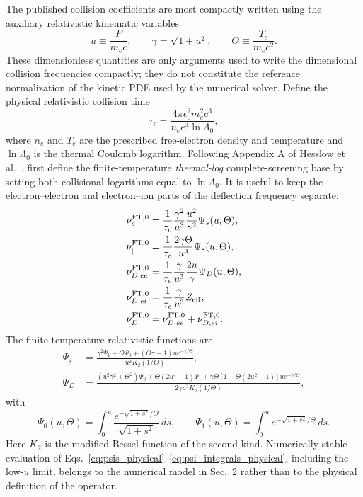 \documentclass[11pt]{article}
\begin{document}
The published collision coefficients are most compactly written using the auxiliary
relativistic kinematic variables
\begin{equation}
 u\equiv\frac{P}{m_ec},
 \qquad
 \gamma=\sqrt{1+u^2},
 \qquad
 \Theta\equiv\frac{T_e}{m_ec^2}.
 \label{eq:collision_auxiliary_variables}
\end{equation}
These dimensionless quantities are only arguments used to write the dimensional collision
frequencies compactly; they do not constitute the reference normalization of the kinetic
PDE used by the numerical solver.  Define the physical relativistic collision time
\begin{equation}
 \tau_c
 =\frac{4\pi\epsilon_0^2m_e^2c^3}
 {n_e e^4\ln\Lambda_0},
 \label{eq:physical_collision_time}
\end{equation}
where $n_e$ and $T_e$ are the prescribed free-electron density and temperature and
$\ln\Lambda_0$ is the thermal Coulomb logarithm.  Following Appendix A of
Hesslow et al.~\cite{Hesslow2019Dreicer}, first define the finite-temperature
\emph{thermal-log} complete-screening base by setting both collisional logarithms equal
to $\ln\Lambda_0$.  It is useful to keep the electron--electron and electron--ion
parts of the deflection frequency separate:
\begin{align}
 \nu_s^{\rm FT,0}
 &=\frac{1}{\tau_c}\frac{\gamma^2}{u^3}
   \frac{u^2}{\gamma^2}\Psi_s(u,\Theta),
 \label{eq:physical_nus}\\
 \nu_\parallel^{\rm FT,0}
 &=\frac{1}{\tau_c}\frac{2\gamma\Theta}{u^3}\Psi_s(u,\Theta),
 \label{eq:physical_nupar}\\
 \nu_{D,ee}^{\rm FT,0}
 &=\frac{1}{\tau_c}\frac{\gamma}{u^3}
   \frac{2u}{\gamma}\Psi_D(u,\Theta),\\
 \nu_{D,ei}^{\rm FT,0}
 &=\frac{1}{\tau_c}\frac{\gamma}{u^3}Z_{\rm eff},\\
 \nu_D^{\rm FT,0}
 &=\nu_{D,ee}^{\rm FT,0}+\nu_{D,ei}^{\rm FT,0}.
 \label{eq:physical_nud}
\end{align}
The finite-temperature relativistic functions are
\begin{align}
 \Psi_s
 &=\frac{
   \gamma^2\Psi_1-\Theta\Psi_0
   +(\Theta\gamma-1)u e^{-\gamma/\Theta}}
  {u^2K_2(1/\Theta)},
 \label{eq:psis_physical}\\
 \Psi_D
 &=\frac{
  (u^2\gamma^2+\Theta^2)\Psi_0
  +\Theta(2u^4-1)\Psi_1
  +\gamma\Theta[1+\Theta(2u^2-1)]u e^{-\gamma/\Theta}}
  {2\gamma u^3K_2(1/\Theta)},
 \label{eq:psid_physical}
\end{align}
with
\begin{equation}
 \Psi_0(u,\Theta)
 =\int_0^u\frac{e^{-\sqrt{1+s^2}/\Theta}}{\sqrt{1+s^2}}\,ds,
 \qquad
 \Psi_1(u,\Theta)
 =\int_0^u e^{-\sqrt{1+s^2}/\Theta}\,ds.
 \label{eq:psi_integrals_physical}
\end{equation}
Here $K_2$ is the modified Bessel function of the second kind.  Numerically stable
evaluation of Eqs.~\eqref{eq:psis_physical}--\eqref{eq:psi_integrals_physical}, including
the low-$u$ limit, belongs to the numerical model in Sec.~2 rather than to the physical
definition of the operator.
\end{document}
